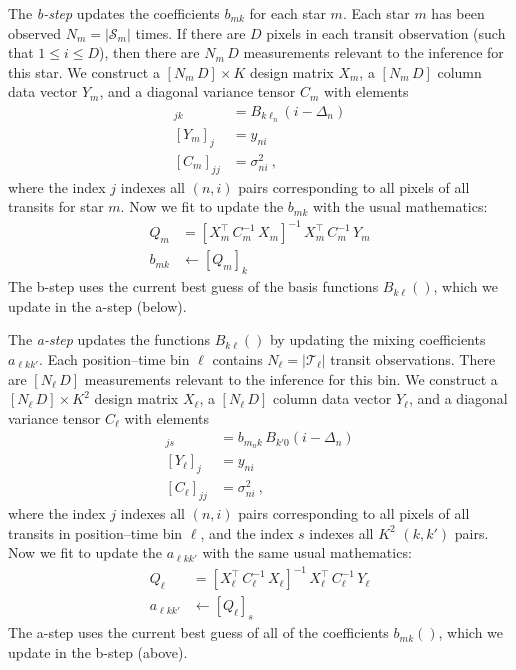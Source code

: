 \documentclass{article}
\newcommand{\set}[1]{\mathscr{#1}}
\begin{document}
The \emph{b-step} updates the coefficients $b_{mk}$ for each star $m$.
Each star $m$ has been observed $N_m=|\set{S}_m|$ times.
If there are $D$ pixels in each transit observation (such that $1\leq i\leq D$), then there are $N_m\,D$ measurements relevant to the inference for this star.
We construct a $[N_m\,D]\times K$ design matrix $X_m$, a $[N_m\,D]$ column data vector $Y_m$, and a diagonal variance tensor $C_m$ with elements 
\begin{align}
    [X_m]_{jk} &= B_{k\ell_n}(i-\Delta_n) \\
    [Y_m]_j &= y_{ni} \\
    [C_m]_{jj} &= \sigma^2_{ni} ~,
\end{align}
where the index $j$ indexes all $(n,i)$ pairs corresponding to all pixels of all transits for star $m$.
Now we fit to update the $b_{mk}$ with the usual mathematics:
\begin{align}
    Q_m &= [X_m^\top\,C^{-1}_m\,X_m]^{-1}\,X_m^\top\,C^{-1}_m\,Y_m \\
    b_{mk} &\leftarrow [Q_m]_{k}
\end{align}
The b-step uses the current best guess of the basis functions $B_{k\ell}()$, which we update in the a-step (below).

The \emph{a-step} updates the functions $B_{k\ell}()$ by updating the mixing coefficients $a_{\ell kk'}$.
Each position--time bin $\ell$ contains $N_\ell=|\set{T}_\ell|$ transit observations.
There are $[N_\ell\,D]$ measurements relevant to the inference for this bin.
We construct a $[N_\ell\,D]\times K^2$ design matrix $X_\ell$, a $[N_\ell\,D]$ column data vector $Y_\ell$, and a diagonal variance tensor $C_\ell$ with elements 
\begin{align}
    [X_\ell]_{js} &= b_{m_nk}\,B_{k'0}(i-\Delta_n) \\
    [Y_\ell]_j &= y_{ni} \\
    [C_\ell]_{jj} &= \sigma^2_{ni} ~,
\end{align}
where the index $j$ indexes all $(n,i)$ pairs corresponding to all pixels of all transits in position--time bin $\ell$,
and the index $s$ indexes all $K^2$ $(k,k')$ pairs.
Now we fit to update the $a_{\ell kk'}$ with the same usual mathematics:
\begin{align}
    Q_\ell &= [X_\ell^\top\,C^{-1}_\ell\,X_\ell]^{-1}\,X_\ell^\top\,C^{-1}_\ell\,Y_\ell \\
    a_{\ell kk'} &\leftarrow [Q_\ell]_{s}
\end{align}
The a-step uses the current best guess of all of the coefficients $b_{mk}()$, which we update in the b-step (above).
\end{document}
